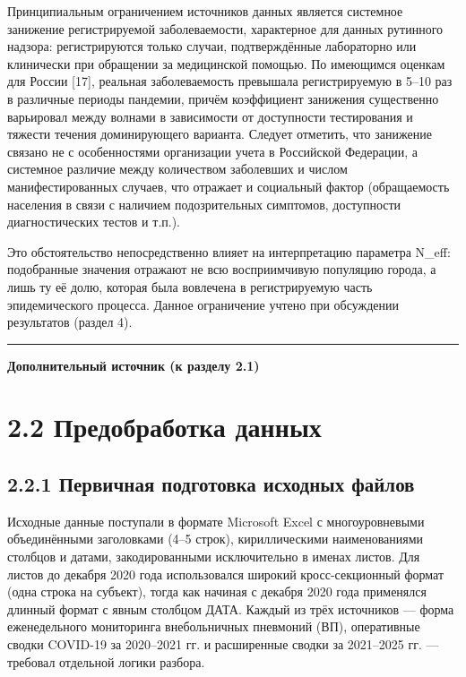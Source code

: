 \documentclass[12pt]{article}
\begin{document}
Принципиальным ограничением источников данных является системное
занижение регистрируемой заболеваемости, характерное для данных
рутинного надзора: регистрируются только случаи, подтверждённые
лабораторно или клинически при обращении за медицинской помощью. По
имеющимся оценкам для России {[}17{]}, реальная заболеваемость превышала
регистрируемую в 5--10 раз в различные периоды пандемии, причём
коэффициент занижения существенно варьировал между волнами в зависимости
от доступности тестирования и тяжести течения доминирующего варианта.
Следует отметить, что занижение связано не с особенностями организации
учета в Российской Федерации, а системное различие между количеством
заболевших и числом манифестированных случаев, что отражает и социальный
фактор (обращаемость населения в связи с наличием подозрительных
симптомов, доступности диагностических тестов и т.п.).

Это обстоятельство непосредственно влияет на интерпретацию параметра
N\_eff: подобранные значения отражают не всю восприимчивую популяцию
города, а лишь ту её долю, которая была вовлечена в регистрируемую часть
эпидемического процесса. Данное ограничение учтено при обсуждении
результатов (раздел 4).

\begin{center}\rule{0.5\linewidth}{0.5pt}\end{center}

\textbf{Дополнительный источник (к разделу 2.1)}

\section{2.2 Предобработка
данных}\label{ux43fux440ux435ux434ux43eux431ux440ux430ux431ux43eux442ux43aux430-ux434ux430ux43dux43dux44bux445}

\subsection{2.2.1 Первичная подготовка исходных
файлов}\label{ux43fux435ux440ux432ux438ux447ux43dux430ux44f-ux43fux43eux434ux433ux43eux442ux43eux432ux43aux430-ux438ux441ux445ux43eux434ux43dux44bux445-ux444ux430ux439ux43bux43eux432}

Исходные данные поступали в формате Microsoft Excel с многоуровневыми
объединёнными заголовками (4--5 строк), кириллическими наименованиями
столбцов и датами, закодированными исключительно в именах листов. Для
листов до декабря 2020 года использовался широкий кросс-секционный
формат (одна строка на субъект), тогда как начиная с декабря 2020 года
применялся длинный формат с явным столбцом ДАТА. Каждый из трёх
источников --- форма еженедельного мониторинга внебольничных пневмоний
(ВП), оперативные сводки COVID-19 за 2020--2021 гг. и расширенные сводки
за 2021--2025 гг. --- требовал отдельной логики разбора.
\end{document}
